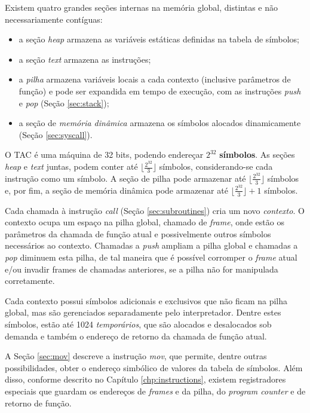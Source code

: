 \documentclass[12pt,a4paper,extrafontsizes,article]{memoir}
\begin{document}
Existem quatro grandes seções internas na memória global, distintas e não necessariamente contíguas:
\begin{itemize}
  \item a seção \textit{heap} armazena as variáveis estáticas definidas na tabela de símbolos;
  \item a seção \textit{text} armazena as instruções;
  \item a \textit{pilha} armazena variáveis locais a cada contexto (inclusive parâmetros de função) e pode ser
  expandida em tempo de execução, com as instruções \textit{push} e \textit{pop} (Seção \ref{sec:stack});
  \item a seção de \textit{memória dinâmica} armazena os símbolos alocados dinamicamente (Seção \ref{sec:syscall}).
\end{itemize}

O TAC é uma máquina de 32 bits, podendo endereçar $2^{32}$ \textbf{símbolos}. As seções \textit{heap} e \textit{text}
juntas, podem conter até $\lfloor\frac{2^{32}}{3}\rfloor$ símbolos, considerando-se cada instrução como um símbolo. A
seção de pilha pode armazenar até $\lfloor\frac{2^{32}}{3}\rfloor$ símbolos e, por fim, a seção de memória dinâmica pode
armazenar até $\lfloor\frac{2^{32}}{3}\rfloor+1$ símbolos.

Cada chamada à instrução \textit{call} (Seção \ref{sec:subroutines}) cria um novo \textit{contexto}. O contexto ocupa um
espaço na pilha global, chamado de \textit{frame}, onde estão os parâmetros da chamada de função atual e possivelmente
outros símbolos necessários ao contexto. Chamadas a \textit{push} ampliam a pilha global e chamadas a \textit{pop}
diminuem esta pilha, de tal maneira que é possível corromper o \textit{frame} atual e/ou invadir frames de chamadas
anteriores, se a pilha não for manipulada corretamente.

Cada contexto possui símbolos adicionais e exclusivos que não ficam na pilha global, mas são gerenciados separadamente
pelo interpretador. Dentre estes símbolos, estão até 1024 \textit{temporários}, que são alocados e desalocados sob
demanda e também o endereço de retorno da chamada de função atual.

A Seção \ref{sec:mov} descreve a instrução \textit{mov}, que permite, dentre outras possibilidades, obter o endereço
simbólico de valores da tabela de símbolos. Além disso, conforme descrito no Capítulo \ref{chp:instructions}, existem
registradores especiais que guardam os endereços de \textit{frames} e da pilha, do \textit{program counter} e de
retorno de função.
\end{document}
